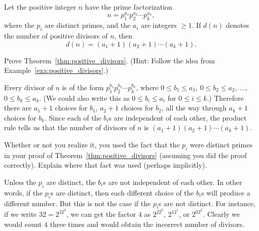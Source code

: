 \begin{thm}\label{thm:positive_divisors}
Let the positive integer $n$ have the prime factorization 
$$n = p_1^{a_1}p_2^{a_2}\cdots p_k^{a_k},
$$where the $p_i$ are distinct primes, and the $a_i$ are integers
$\geq 1$. If $d(n)$ denotes the number of positive divisors of $n$,
then $$d(n) = (a_1 + 1)(a_2 + 1)\cdots (a_k + 1).   $$
\end{thm}
\begin{exer}
Prove Theorem~\ref{thm:positive_divisors}.
(Hint: Follow the idea from Example~\ref{exa:positive_divisors}.)
\vspace*{3.5in}
\begin{answer}
Every divisor of $n$ is of the form $p_1^{b_1}p_2^{b_2}\cdots p_k^{b_k}$,
where $0\leq b_1\leq a_1$, $0\leq b_2\leq a_2$, $\ldots$, $0\leq b_k\leq a_k$.
(We could also write this as $0\leq b_i\leq a_i$ for $0\leq i\leq k$.)
Therefore there are $a_1+1$ choices for $b_1$, 
$a_2+1$ choices for $b_2$, all the way through
$a_k+1$ choices for $b_k$.  
Since each of the $b_i$s are independent of each other,
the product rule tells us that the number of divisors of $n$ is
$(a_1 + 1)(a_2 + 1)\cdots (a_k + 1)$.
\end{answer}
\end{exer}

\begin{ques}
Whether or not you realize it, you used the fact that the $p_i$ were distinct primes
in your proof of Theorem~\ref{thm:positive_divisors} (assuming you did the proof
correctly).  Explain where that fact was used (perhaps implicitly).

\noindent
\answerlinetwo
\begin{answer}
Unless the $p_i$ are distinct, the $b_i$s are not independent of each other.
In other words, if the $p_i$s are distinct, then each different choice of the $b_i$s
will produce a different number.  But this is not the case if the $p_i$s are not 
distinct.  For instance, if we write $32=2^32^2$, we can get the factor $4$ as
$2^22^0$, $2^12^1$, or $2^02^2$.  Clearly we would count $4$ three times and
would obtain the incorrect number of divisors.
\end{answer}
\end{ques}


